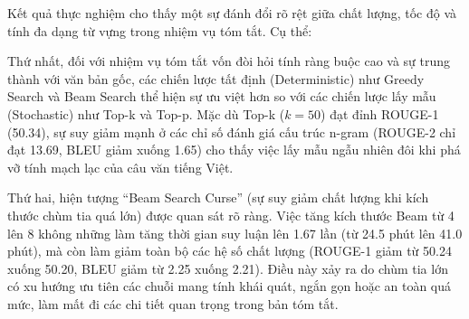 \documentclass{article}
\begin{document}
\begin{table}[H]
\centering
\caption{Ảnh hưởng của các chiến lược giải mã khác nhau đến chất lượng và thời gian sinh tóm tắt trên mô hình BARTpho.}
\label{tab:decoding_eval}
\end{table}

Kết quả thực nghiệm cho thấy một sự đánh đổi rõ rệt giữa chất lượng, tốc độ và tính đa dạng từ vựng trong nhiệm vụ tóm tắt. Cụ thể:

Thứ nhất, đối với nhiệm vụ tóm tắt vốn đòi hỏi tính ràng buộc cao và sự trung thành với văn bản gốc, các chiến lược tất định (Deterministic) như Greedy Search và Beam Search thể hiện sự ưu việt hơn so với các chiến lược lấy mẫu (Stochastic) như Top-k và Top-p. Mặc dù Top-k ($k=50$) đạt đỉnh ROUGE-1 (50.34), sự suy giảm mạnh ở các chỉ số đánh giá cấu trúc n-gram (ROUGE-2 chỉ đạt 13.69, BLEU giảm xuống 1.65) cho thấy việc lấy mẫu ngẫu nhiên đôi khi phá vỡ tính mạch lạc của câu văn tiếng Việt.

Thứ hai, hiện tượng ``Beam Search Curse'' (sự suy giảm chất lượng khi kích thước chùm tia quá lớn) được quan sát rõ ràng. Việc tăng kích thước Beam từ 4 lên 8 không những làm tăng thời gian suy luận lên 1.67 lần (từ 24.5 phút lên 41.0 phút), mà còn làm giảm toàn bộ các hệ số chất lượng (ROUGE-1 giảm từ 50.24 xuống 50.20, BLEU giảm từ 2.25 xuống 2.21). Điều này xảy ra do chùm tia lớn có xu hướng ưu tiên các chuỗi mang tính khái quát, ngắn gọn hoặc an toàn quá mức, làm mất đi các chi tiết quan trọng trong bản tóm tắt.
\end{document}
